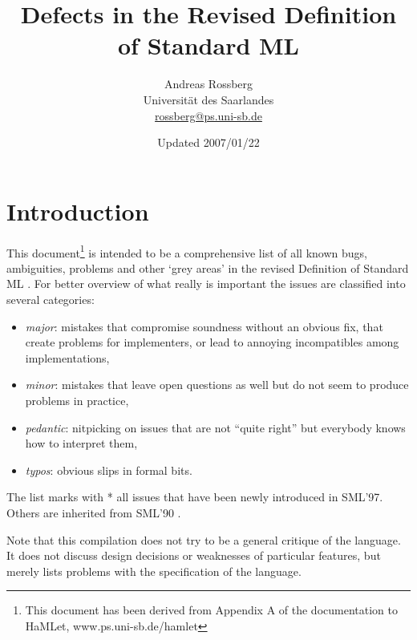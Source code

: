 \documentclass{article}
\begin{document}

\title{Defects in the Revised Definition of Standard ML}

\author{
Andreas Rossberg \\
Universit\"at des Saarlandes \\
\url{rossberg@ps.uni-sb.de}
}

\date{Updated 2007/01/22}

\maketitle


\section{Introduction}

This document\footnote{This document has been derived from Appendix A of the documentation to HaMLet, www.ps.uni-sb.de/hamlet} is intended to be a comprehensive list of all known bugs, ambiguities, problems and other `grey areas' in the revised Definition of Standard ML \cite{definition}. For better overview of what really is important the issues are classified into several categories:

\begin{itemize}
\item {\em major}: mistakes that compromise soundness without an obvious fix, that create problems for implementers, or lead to annoying incompatibles among implementations,
\item {\em minor}: mistakes that leave open questions as well but do not seem to produce problems in practice,
\item {\em pedantic}: nitpicking on issues that are not ``quite right'' but everybody knows how to interpret them,
\item {\em typos}: obvious slips in formal bits.
\end{itemize}

The list marks with * all issues that have been newly introduced in SML'97. Others are inherited from SML'90 \cite{definition90}.

Note that this compilation does not try to be a general critique of the language. It does not discuss design decisions or weaknesses of particular features, but merely lists problems with the specification of the language.
\end{document}
